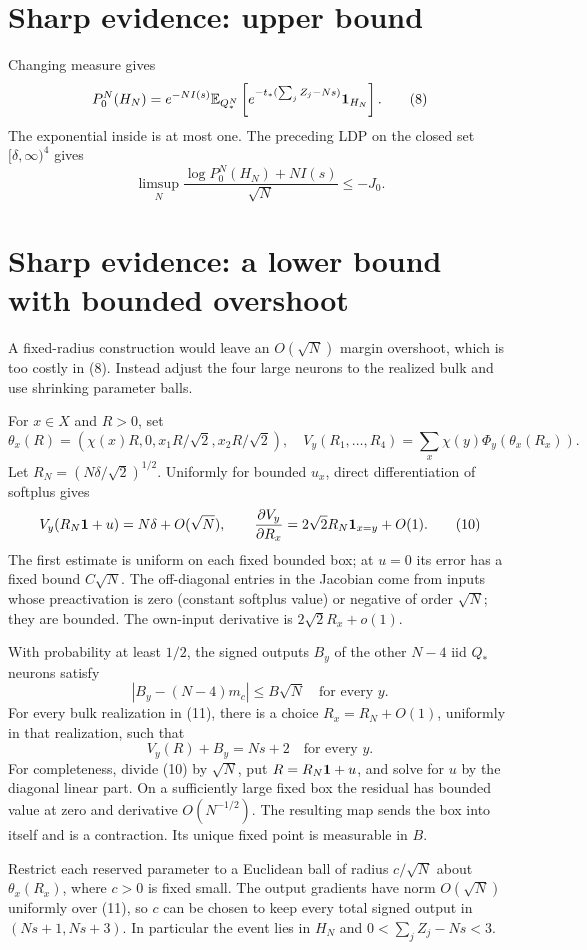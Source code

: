 \documentclass[11pt]{article}
\newcommand{\E}{\mathbb E}\newcommand{\Pp}{\mathbb P}
\begin{document}
\section{Sharp evidence: upper bound}
Changing measure gives
\[
 P_0^N(H_N)=e^{-NI(s)}
 \E_{Q_*^N}\left[
 e^{-t_*(\sum_jZ_j-Ns)}\one_{H_N}\right].                    \tag{8}
\]
The exponential inside is at most one. The preceding LDP on
the closed set $[\delta,\infty)^4$ gives
\[
 \limsup_N\frac{\log P_0^N(H_N)+NI(s)}{\sqrt N}\le-J_0.       \tag{9}
\]

\section{Sharp evidence: a lower bound with bounded overshoot}
A fixed-radius construction would leave an $O(\sqrt N)$ margin
overshoot, which is too costly in (8). Instead adjust the four large
neurons to the realized bulk and use shrinking parameter balls.

For $x\in X$ and $R>0$, set
\[
 \theta_x(R)=(\chi(x)R,0,x_1R/\sqrt2,x_2R/\sqrt2),\quad
 V_y(R_1,\ldots,R_4)=\sum_x\chi(y)\Phi_y(\theta_x(R_x)).
\]
Let $R_N=(N\delta/\sqrt2)^{1/2}$. Uniformly for bounded
$u_x$, direct differentiation of softplus gives
\[
 V_y(R_N\mathbf 1+u)=N\delta+O(\sqrt N),\qquad
 \frac{\partial V_y}{\partial R_x}
   =2\sqrt2 R_N\mathbf 1_{x=y}+O(1).                             \tag{10}
\]
The first estimate is uniform on each fixed bounded box; at $u=0$
its error has a fixed bound $C\sqrt N$. The off-diagonal entries in
the Jacobian come from inputs whose preactivation is zero (constant
softplus value) or negative of order $\sqrt N$; they are bounded.
The own-input derivative is $2\sqrt2 R_x+o(1)$.

With probability at least $1/2$, the signed outputs $B_y$ of the
other $N-4$ iid $Q_*$ neurons satisfy
\[
 |B_y-(N-4)m_c|\le B\sqrt N\quad\text{for every }y.          \tag{11}
\]
For every bulk realization in (11), there is a choice
$R_x=R_N+O(1)$, uniformly in that realization, such that
\[
 V_y(R)+B_y=Ns+2\quad\text{for every }y.                    \tag{12}
\]
For completeness, divide (10) by $\sqrt N$, put $R=R_N\mathbf 1+u$,
and solve for $u$ by the diagonal linear part. On a sufficiently
large fixed box the residual has bounded value at zero and derivative
$O(N^{-1/2})$. The resulting map sends the box into itself and is
a contraction. Its unique fixed point is measurable in $B$.

Restrict each reserved parameter to a Euclidean ball of radius
$c/\sqrt N$ about $\theta_x(R_x)$, where $c>0$ is fixed small.
The output gradients have norm $O(\sqrt N)$ uniformly over (11),
so $c$ can be chosen to keep every total signed output in
$(Ns+1,Ns+3)$. In particular the event lies in $H_N$ and
$0<\sum_j Z_j-Ns<3$.
\end{document}

